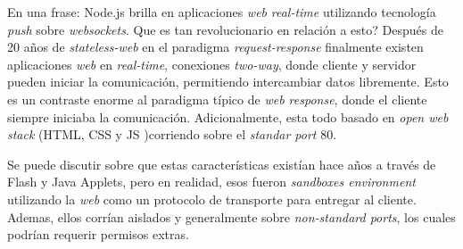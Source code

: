 


En una frase: Node.js brilla en aplicaciones \textit{web} \textit{real-time} utilizando tecnología \textit{push} sobre \textit{websockets}. Que es tan revolucionario en relación a esto? Después de 20 años de \textit{stateless-web} en el paradigma \textit{request-response} finalmente existen aplicaciones \textit{web} en \textit{real-time}, conexiones \textit{two-way}, donde cliente y servidor pueden iniciar la comunicación, permitiendo intercambiar datos libremente. Esto es un contraste enorme al paradigma típico de \textit{web response}, donde el cliente siempre iniciaba la comunicación. Adicionalmente, esta todo basado en \textit{open web stack} (HTML, CSS y JS )corriendo sobre el \textit{standar port} 80.

Se puede discutir sobre que estas características existían hace años a través de Flash y Java Applets, pero en realidad, esos fueron \textit{sandboxes environment} utilizando la \textit{web} como un protocolo de transporte para entregar al cliente. Ademas, ellos corrían aislados y generalmente sobre \textit{non-standard ports}, los cuales podrían requerir permisos extras.

